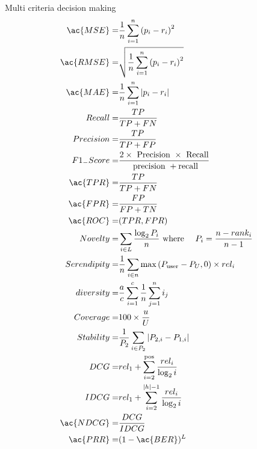 \begin{frame}{Multi criteria decision making}
\begin{align}
\ac{MSE}=                     & \frac{1}{n} \sum_{i=1}^{n}\left(p_{i}-r_{i}\right)^{2}                                        \\
\ac{RMSE}=                    & \sqrt{\frac{1}{n} \sum_{i=1}^{n}\left(p_{i}-r_{i}\right)^{2}}                                 \\
\ac{MAE}=                     & \frac{1}{n} \sum_{i=1}^{n}\left|p_{i}-r_{i}\right|                                            \\
Recall=                       & \frac{T P}{T P+F N}                                                                           \\
Precision=                    & \frac{T P}{T P+F P}                                                                           \\
F1_{-}Score=                  & \frac{2 \times \text { Precision } \times \text { Recall}}{\text { precision }+\text {recall}}\\
\ac{TPR} =                    & \frac{T P}{T P+F N}                                                                           \\
\ac{FPR} =                    & \frac{F P}{F P+T N}                                                                           \\
\ac{ROC}=                     & (TPR,FPR)                                                                                     \\
Novelty=                      & \sum_{i \in L} \frac{\log _{2} P_{i}}{n} \text { where } \quad P_{i}=\frac{n-r a n k_{i}}{n-1}\\
Serendipity=                  & \frac{1}{n} \sum_{i \in n} \max \left(P_{\text {user}}-P_{U}, 0\right) \times r e l_{i}       \\
diversity=                    & \frac{a}{c} \sum_{i=1}^{c} \frac{1}{n} \sum_{j=1}^{n} i_{j}                                   \\
Coverage=                     & 100 \times \frac{u}{U}                                                                        \\
Stability=                    & \frac{1}{P_{2}} \sum_{i \in P_{2}}\left|P_{2, i}-P_{1, i}\right|                              \\
DCG=                          & r e l_{1}+\sum_{i=2}^{\text {pos}} \frac{r e l_{i}}{\log _{2} i}                              \\
IDCG=                         & r e l_{1}+\sum_{i=2}^{|h|-1} \frac{r e l_{i}}{\log _{2} i}                                    \\
\ac{NDCG}=                    & \frac{D C G}{I D C G}                                                                         \\
\ac{PRR} =                    & (1-\ac{BER})^{L}                                                                              \\
\end{align}
\end{frame}


